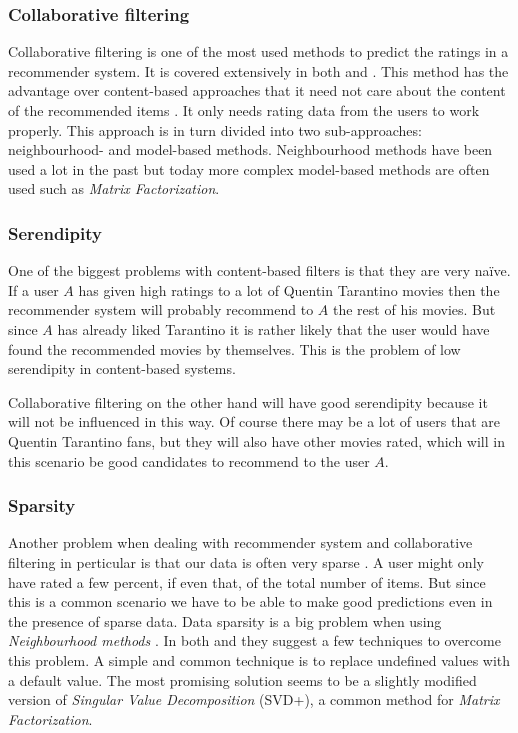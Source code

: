 \documentclass[a4paper,11pt]{article}
\begin{document}
\subsubsection{Collaborative filtering}
Collaborative filtering is one of the most used methods to predict the ratings in
a recommender system. It is covered extensively in both \cite{springerlink:10.1007/978-0-387-85820-3_1} and \cite{1423975}. This method has the advantage over content-based approaches that it need not care about the content of the recommended items \cite{1423975}. It only needs rating data from the users to work properly. This approach is in turn divided into two sub-approaches: neighbourhood- and model-based methods. Neighbourhood methods have been used a lot in the past but today more complex model-based methods are often used such as \emph{Matrix Factorization}.

\subsubsection{Serendipity}
One of the biggest problems with content-based filters is that they are very na\"ive. If a user $A$ has given high ratings to a lot of Quentin Tarantino movies then the recommender system will probably recommend to $A$ the rest of his movies. But since $A$ has already liked Tarantino it is rather likely that the user would have found the recommended movies by themselves. This is the problem of low serendipity in content-based systems.

Collaborative filtering on the other hand will have good serendipity because it will not be influenced in this way. Of course there may be a lot of users that are Quentin Tarantino fans, but they will also have other movies rated, which will in this scenario be good candidates to recommend to the user $A$.

\subsubsection{Sparsity}
Another problem when dealing with recommender system and collaborative filtering in perticular
is that our data is often very sparse \cite{hybridpaper}. A user might only have rated a few percent, 
if even that, of the total number of items. But since this is a common scenario we have to be able to make
good predictions even in the presence of sparse data. Data sparsity is a big problem when using \emph{Neighbourhood methods} \cite{springerlink:10.1007/978-0-387-85820-3_1}. In both \cite{1423975} and \cite{springerlink:10.1007/978-0-387-85820-3_1} they suggest a few techniques to overcome this problem. A simple and common technique is to replace undefined values with a default value. The most promising solution seems to be a slightly modified version of \emph{Singular Value Decomposition} (SVD+), a common method for \emph{Matrix Factorization}.
\end{document}
